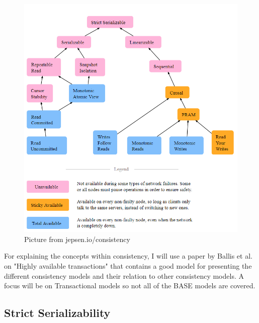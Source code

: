 \documentclass[a4paper,10pt,titlepage]{report}
\begin{document}
\begin{figure}
    \centering
    \includegraphics[scale=0.4]{images/consistency models.PNG}
    \caption{Picture from jepsen.io/consistency}
    \label{fig:jepsenioconsistency}
\end{figure}

For explaining the concepts within consistency, I will use a paper by Ballis et al. on "Highly available transactions"\cite{HighlyAvailableTransactionsVirtuesandLimitations} that contains a good model for presenting the different consistency models and their relation to other consistency models. A focus will be on Transactional models so not all of the BASE models are covered.\\

\subsection{Strict Serializability}
\end{document}
